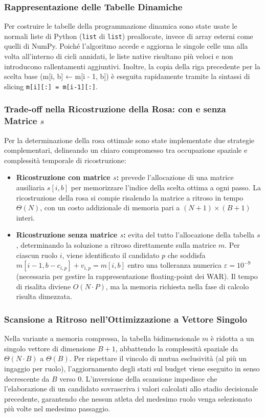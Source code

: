 \subsubsection{Rappresentazione delle Tabelle Dinamiche}
Per costruire le tabelle della programmazione dinamica sono state usate le normali liste di Python (\texttt{list} di \texttt{list}) preallocate, invece di array esterni come quelli di NumPy. Poiché l'algoritmo accede e aggiorna le singole celle una alla volta all'interno di cicli annidati, le liste native risultano più veloci e non introducono rallentamenti aggiuntivi. Inoltre, la copia della riga precedente per la scelta base (m[i, b] ← m[i - 1, b]) è eseguita rapidamente tramite la sintassi di slicing \texttt{m[i][:] = m[i-1][:]}.

\subsubsection{Trade-off nella Ricostruzione della Rosa: con e senza Matrice \texorpdfstring{$s$}{s}}
Per la determinazione della rosa ottimale sono state implementate due strategie complementari, delineando un chiaro compromesso tra occupazione spaziale e complessità temporale di ricostruzione:
\begin{itemize}
	\item \textbf{Ricostruzione con matrice $s$:} prevede l'allocazione di una matrice ausiliaria $s[i, b]$ per memorizzare l'indice della scelta ottima a ogni passo. La ricostruzione della rosa si compie risalendo la matrice a ritroso in tempo $\Theta(N)$, con un costo addizionale di memoria pari a $(N+1) \times (B+1)$ interi.
	\item \textbf{Ricostruzione senza matrice $s$:} evita del tutto l'allocazione della tabella $s$, determinando la soluzione a ritroso direttamente sulla matrice $m$. Per ciascun ruolo $i$, viene identificato il candidato $p$ che soddisfa $m[i-1, b - c_{i, p}] + v_{i, p} = m[i, b]$ entro una tolleranza numerica $\varepsilon = 10^{-9}$ (necessaria per gestire la rappresentazione floating-point dei WAR). Il tempo di risalita diviene $O(N \cdot P)$, ma la memoria richiesta nella fase di calcolo risulta dimezzata.
\end{itemize}

\subsubsection{Scansione a Ritroso nell'Ottimizzazione a Vettore Singolo}
Nella variante a memoria compressa, la tabella bidimensionale $m$ è ridotta a un singolo vettore di dimensione $B+1$, abbattendo la complessità spaziale da $\Theta(N \cdot B)$ a $\Theta(B)$. Per rispettare il vincolo di mutua esclusività (al più un ingaggio per ruolo), l'aggiornamento degli stati sul budget viene eseguito in senso decrescente da $B$ verso $0$. L'inversione della scansione impedisce che l'elaborazione di un candidato sovrascriva i valori calcolati allo stadio decisionale precedente, garantendo che nessun atleta del medesimo ruolo venga selezionato più volte nel medesimo passaggio.

